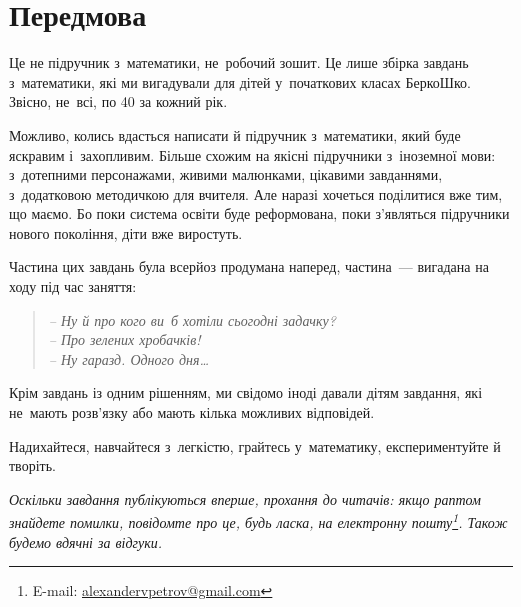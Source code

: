 \chapter*{Передмова}

Це не підручник з~математики, не~робочий зошит.
Це лише збірка завдань з~математики, які ми вигадували для дітей
у~початкових класах БеркоШко.
Звісно, не~всі, по 40 за кожний рік.

Можливо, колись вдасться написати й підручник з~математики,
який буде яскравим і~захопливим.
Більше схожим на якісні підручники з~іноземної мови: з~дотепними персонажами,
живими малюнками, цікавими завданнями, з~додатковою методичкою для вчителя.
Але наразі хочеться поділитися вже тим, що маємо.
Бо поки система освіти буде реформована, поки з’являться підручники
нового покоління, діти вже виростуть.

Частина цих завдань була всерйоз продумана наперед,
частина~--- вигадана на ходу під час заняття:
\begin{quote}
\itshape
-- Ну й про кого ви~б хотіли сьогодні задачку? \\
-- Про зелених хробачків! \\
-- Ну гаразд. Одного дня\ldots
\end{quote}

Крім завдань із одним рішенням, ми свідомо іноді давали дітям завдання,
які не~мають розв’язку або мають кілька можливих відповідей.

Надихайтеся, навчайтеся з~легкістю, грайтесь у~математику,
експериментуйте й творіть. \smiley

\medskip
\medskip

\emph{\small%
Оскільки завдання публікуються вперше, прохання до читачів:
якщо раптом знайдете помилки,
повідомте про це, будь ласка, на електронну пошту\footnote{
    E-mail: \href{mailto:alexandervpetrov@gmail.com}{alexandervpetrov@gmail.com}
}. Також будемо вдячні за відгуки.
}%
\smiley
